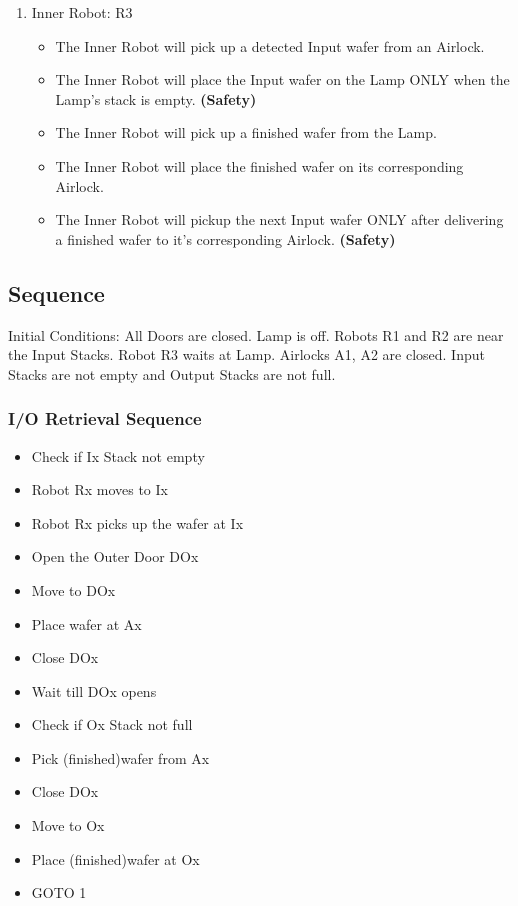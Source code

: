 \documentclass[a4paper,12pt]{article}
\begin{document}
\begin{enumerate}
\item Inner Robot: R3
	\begin{itemize}
	\item The Inner Robot will pick up a detected Input wafer from an Airlock.
	\item The Inner Robot will place the Input wafer on the Lamp ONLY when the Lamp's stack is empty.\textbf{ (Safety)}
	\item The Inner Robot will pick up a finished wafer from the Lamp.
	\item The Inner Robot will place the finished wafer on its corresponding Airlock.
	\item The Inner Robot will pickup the next Input wafer ONLY after delivering a finished wafer to it's corresponding Airlock.\textbf{ (Safety)}
	\end{itemize}

\end{enumerate}

\iffalse
\subsection{Sequence}
Initial Conditions: All Doors are closed. Lamp is off. Robots R1 and R2 are near the Input Stacks. Robot R3 waits at Lamp. Airlocks A1, A2 are closed. Input Stacks are not empty and Output Stacks are not full.
\subsubsection {I/O Retrieval Sequence }
\begin{itemize}
\item Check if Ix Stack not empty
\item Robot Rx moves to Ix
\item Robot Rx picks up the wafer at Ix 
\item Open the Outer Door DOx
\item Move to DOx
\item Place wafer at Ax
\item Close DOx
\item Wait till DOx opens
\item Check if Ox Stack not full
\item Pick (finished)wafer from Ax
\item Close DOx
\item Move to Ox
\item Place (finished)wafer at Ox
\item GOTO 1
\end{itemize}
\end{document}
